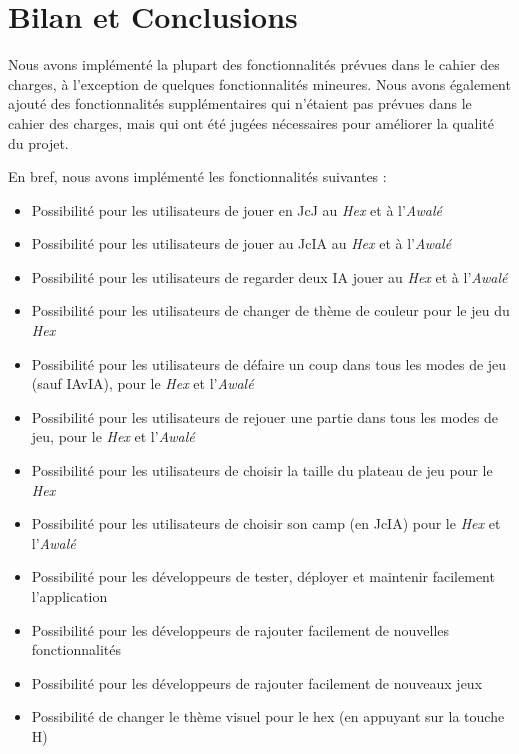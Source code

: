 \section{Bilan et Conclusions}

Nous avons implémenté la plupart des fonctionnalités prévues dans le cahier des charges, à l'exception de quelques
fonctionnalités mineures. Nous avons également ajouté des fonctionnalités supplémentaires qui n'étaient pas prévues
dans le cahier des charges, mais qui ont été jugées nécessaires pour améliorer la qualité du projet.

En bref, nous avons implémenté les fonctionnalités suivantes :

\begin{itemize}
    \item Possibilité pour les utilisateurs de jouer en JcJ au \emph{Hex} et à l'\emph{Awalé}
    \item Possibilité pour les utilisateurs de jouer au JcIA au \emph{Hex} et à l'\emph{Awalé}
    \item Possibilité pour les utilisateurs de regarder deux IA jouer au \emph{Hex} et à l'\emph{Awalé}
    \item Possibilité pour les utilisateurs de changer de thème de couleur pour le jeu du \emph{Hex}
    \item Possibilité pour les utilisateurs de défaire un coup dans tous les modes de jeu (sauf IAvIA), pour le \emph{Hex} et l'\emph{Awalé}
    \item Possibilité pour les utilisateurs de rejouer une partie dans tous les modes de jeu, pour le \emph{Hex} et l'\emph{Awalé}
    \item Possibilité pour les utilisateurs de choisir la taille du plateau de jeu pour le \emph{Hex}
    \item Possibilité pour les utilisateurs de choisir son camp (en JcIA) pour le \emph{Hex} et l'\emph{Awalé}
    \item Possibilité pour les développeurs de tester, déployer et maintenir facilement l'application
    \item Possibilité pour les développeurs de rajouter facilement de nouvelles fonctionnalités
    \item Possibilité pour les développeurs de rajouter facilement de nouveaux jeux
    \item Possibilité de changer le thème visuel pour le hex (en appuyant sur la touche H)
\end{itemize}

